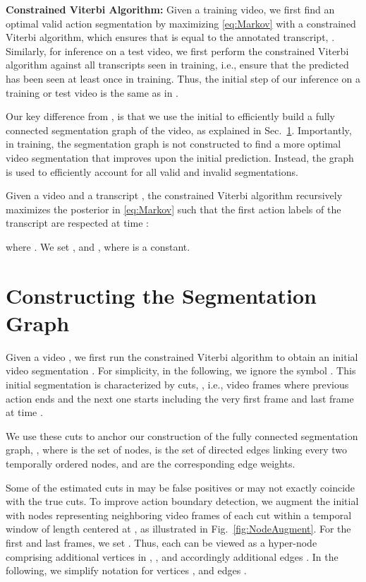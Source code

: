\documentclass[10pt,twocolumn,letterpaper]{article}
\begin{document}
{\bf Constrained Viterbi Algorithm:} Given a training video, we first find an optimal valid action segmentation  by maximizing \eqref{eq:Markov} with a constrained Viterbi algorithm, which ensures that  is equal to the annotated transcript, . Similarly, for inference on a test video, we first perform the constrained Viterbi algorithm against all transcripts  seen in training, i.e., ensure that the predicted  has been seen at least once in training. Thus, the initial step of our inference on a training or test video is the same as in \cite{richard2018neuralnetwork}.


Our key difference from \cite{richard2018neuralnetwork}, is that we use the initial  to efficiently build a fully connected segmentation graph of the video, as explained in Sec.~\ref{sec:SegmentationGraph}. 
Importantly, in training, the segmentation graph is not constructed to find a more optimal video segmentation that improves upon the initial prediction. Instead, the graph is used to efficiently account for all valid and invalid segmentations. 

Given a video  and a transcript , the constrained Viterbi algorithm recursively maximizes the posterior in \eqref{eq:Markov} such that the first  action labels of the transcript  are respected at time :

where . We set , and , where  is a constant.


\section{Constructing the Segmentation Graph}\label{sec:SegmentationGraph}

Given a video , we first run the constrained Viterbi algorithm to obtain an initial video segmentation  . For simplicity, in the following, we ignore the symbol . This initial segmentation is characterized by  cuts, , i.e., video frames where previous action ends and the next one starts including the very first frame  and last frame  at time . 

We use these cuts to anchor our construction of the fully connected segmentation graph, , where  is the set of nodes,  is the set of directed edges linking every two temporally ordered nodes, and  are the corresponding edge weights. 

Some of the estimated cuts in  may be false positives or may not exactly coincide with the true cuts. To improve action boundary detection, we augment the initial  with nodes representing neighboring video frames of each cut  within a temporal window of length  centered at , as illustrated in Fig.~\ref{fig:NodeAugment}. For the first and last frames, we set . Thus, each  can be viewed as a hyper-node comprising additional vertices in , , and accordingly additional  edges .  In the following, we simplify notation for vertices , and edges  .
\end{document}
